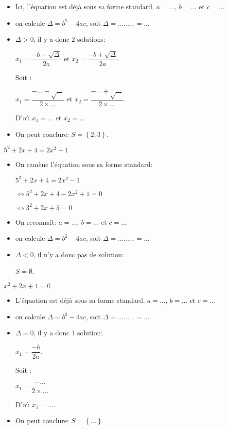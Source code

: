 \documentclass[a4paper,12pt]{scrartcl}
\begin{document}
\begin{itemize}
\item Ici, l'équation est déjà sous sa forme standard. $a = \ldots$, $b = \ldots$ et $c = \ldots$
\item on calcule $\Delta = b^2 - 4ac$, soit $\Delta = \ldots\ldots\ldots = \ldots$
\item $\Delta > 0$, il y a donc 2 solutions: 

$x_1 = \dfrac{-b - \sqrt{\Delta}}{2a}$ et $x_2 = \dfrac{-b + \sqrt{\Delta}}{2a}$.

Soit :

$x_1 = \dfrac{-\ldots - \sqrt{\ldots}}{2\times \ldots}$ et $x_2 = \dfrac{-\ldots + \sqrt{\ldots}}{2\times \ldots}$.

D'où $x_1 = \ldots$ et $x_2 = \ldots$

\item On peut conclure: $S = \left\lbrace 2;3 \right\rbrace$.

\end{itemize}


\exemple{}
$5^2 + 2x + 4 = 2x^2 - 1$

\begin{itemize}
\item On ramène l'équation sous sa forme standard:

$5^2 + 2x + 4 = 2x^2 - 1$

$\Leftrightarrow 5^2 + 2x + 4 -  2x^2 + 1= 0$

$\Leftrightarrow 3^2 + 2x + 5 = 0$

\item On reconnaît: $a = \ldots$, $b = \ldots$ et $c = \ldots$
\item on calcule $\Delta = b^2 - 4ac$, soit $\Delta = \ldots\ldots\ldots = \ldots$
\item $\Delta < 0$, il n'y a donc pas de solution: 

$S = \emptyset$.

\end{itemize}

\exemple{}
$x^2 +2x + 1 = 0$

\begin{itemize}
\item L'équation est déjà sous sa forme standard. $a = \ldots$, $b = \ldots$ et $c = \ldots$
\item on calcule $\Delta = b^2 - 4ac$, soit $\Delta = \ldots\ldots\ldots = \ldots$
\item $\Delta = 0$, il y a donc 1 solution: 

$x_1 = \dfrac{-b }{2a}$.

Soit :

$x_1 = \dfrac{-\ldots}{2\times \ldots}$

D'où $x_1 = \ldots$.

\item On peut conclure: $S = \left\lbrace \ldots \right\rbrace$

\end{itemize}
\end{document}
